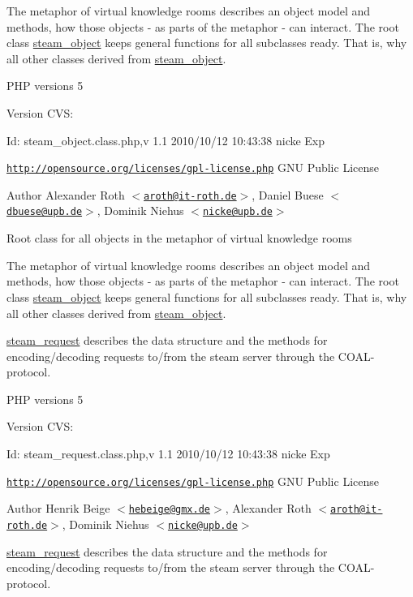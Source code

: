 The metaphor of virtual knowledge rooms describes an object model and methods, how those objects -\/ as parts of the metaphor -\/ can interact. The root class \hyperlink{classsteam__object}{steam\_\-object} keeps general functions for all subclasses ready. That is, why all other classes derived from \hyperlink{classsteam__object}{steam\_\-object}.

PHP versions 5

\begin{DoxyVersion}{Version}
CVS: 
\end{DoxyVersion}
\begin{DoxyParagraph}{Id:}
steam\_\-object.class.php,v 1.1 2010/10/12 10:43:38 nicke Exp 
\end{DoxyParagraph}


\href{http://opensource.org/licenses/gpl-license.php}{\tt http://opensource.org/licenses/gpl-\/license.php} GNU Public License \begin{DoxyAuthor}{Author}
Alexander Roth $<$\href{mailto:aroth@it-roth.de}{\tt aroth@it-\/roth.de}$>$, Daniel Buese $<$\href{mailto:dbuese@upb.de}{\tt dbuese@upb.de}$>$, Dominik Niehus $<$\href{mailto:nicke@upb.de}{\tt nicke@upb.de}$>$
\end{DoxyAuthor}
Root class for all objects in the metaphor of virtual knowledge rooms

The metaphor of virtual knowledge rooms describes an object model and methods, how those objects -\/ as parts of the metaphor -\/ can interact. The root class \hyperlink{classsteam__object}{steam\_\-object} keeps general functions for all subclasses ready. That is, why all other classes derived from \hyperlink{classsteam__object}{steam\_\-object}.

\hyperlink{classsteam__request}{steam\_\-request} describes the data structure and the methods for encoding/decoding requests to/from the steam server through the COAL-\/protocol.

PHP versions 5 \begin{DoxyVersion}{Version}
CVS: 
\end{DoxyVersion}
\begin{DoxyParagraph}{Id:}
steam\_\-request.class.php,v 1.1 2010/10/12 10:43:38 nicke Exp 
\end{DoxyParagraph}


\href{http://opensource.org/licenses/gpl-license.php}{\tt http://opensource.org/licenses/gpl-\/license.php} GNU Public License \begin{DoxyAuthor}{Author}
Henrik Beige $<$\href{mailto:hebeige@gmx.de}{\tt hebeige@gmx.de}$>$, Alexander Roth $<$\href{mailto:aroth@it-roth.de}{\tt aroth@it-\/roth.de}$>$, Dominik Niehus $<$\href{mailto:nicke@upb.de}{\tt nicke@upb.de}$>$
\end{DoxyAuthor}
\hyperlink{classsteam__request}{steam\_\-request} describes the data structure and the methods for encoding/decoding requests to/from the steam server through the COAL-\/protocol.

